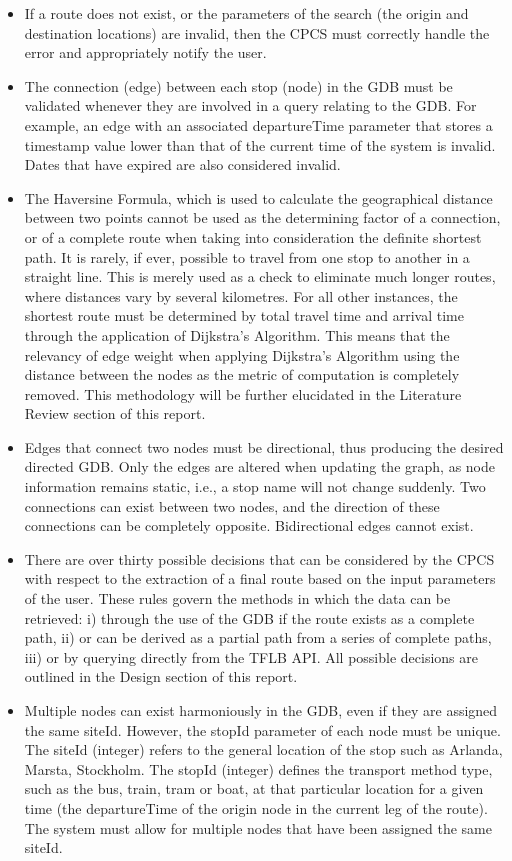 \documentclass[12pt]{article}   	%
\begin{document}
\begin{itemize}
	\item If a route does not exist, or the parameters of the search (the origin and destination locations) are invalid, then the CPCS must correctly handle the error and appropriately notify the user.
	\item The connection (edge) between each stop (node) in the GDB must be validated whenever they are involved in a query relating to the GDB. For example, an edge with an associated departureTime parameter that stores a timestamp value lower than that of the current time of the system is invalid. Dates that have expired are also considered invalid.
	\item The Haversine Formula, which is used to calculate the geographical distance between two points cannot be used as the determining factor of a connection, or of a complete route when taking into consideration the definite shortest path. It is rarely, if ever, possible to travel from one stop to another in a straight line. This is merely used as a check to eliminate much longer routes, where distances vary by several kilometres. For all other instances, the shortest route must be determined by total travel time and arrival time through the application of Dijkstra’s Algorithm. This means that the relevancy of edge weight when applying Dijkstra’s Algorithm using the distance between the nodes as the metric of computation is completely removed. This methodology will be further elucidated in the Literature Review section of this report.
	\item Edges that connect two nodes must be directional, thus producing the desired directed GDB. Only the edges are altered when updating the graph, as node information remains static, i.e., a stop name will not change suddenly. Two connections can exist between two nodes, and the direction of these connections can be completely opposite. Bidirectional edges cannot exist.
	\item There are over thirty possible decisions that can be considered by the CPCS with respect to the extraction of a final route based on the input parameters of the user. These rules govern the methods in which the data can be retrieved: i) through the use of the GDB if the route exists as a complete path, ii) or can be derived as a partial path from a series of complete paths, iii) or by querying directly from the TFLB API. All possible decisions are outlined in the Design section of this report.
	\item Multiple nodes can exist harmoniously in the GDB, even if they are assigned the same siteId. However, the stopId parameter of each node must be unique. The siteId (integer) refers to the general location of the stop such as Arlanda, Marsta, Stockholm. The stopId (integer) defines the transport method type, such as the bus, train, tram or boat, at that particular location for a given time (the departureTime of the origin node in the current leg of the route). The system must allow for multiple nodes that have been assigned the same siteId.

\end{itemize}
\end{document}
